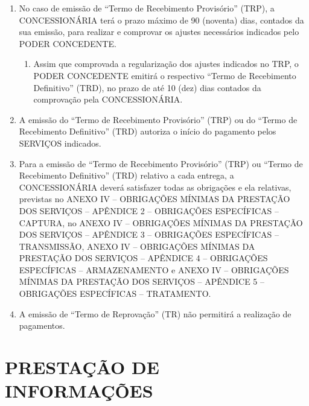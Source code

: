 \documentclass[a4paper,11pt]{report} %
\begin{document}
\begin{enumerate}
\item \label{itm:E3YR}	No caso de emissão de “Termo de Recebimento Provisório” (TRP), a CONCESSIONÁRIA terá o prazo máximo de 90 (noventa) dias, contados da sua emissão, para realizar e comprovar os ajustes necessários indicados pelo PODER CONCEDENTE.

\begin{enumerate}[label*=\arabic*.]
\item \label{itm:PAUP} Assim que comprovada a regularização dos ajustes indicados no TRP, o PODER CONCEDENTE emitirá o respectivo “Termo de Recebimento Definitivo” (TRD), no prazo de até 10 (dez) dias contados da comprovação pela CONCESSIONÁRIA. 
\end{enumerate}

\item \label{itm:79FQ}	A emissão do “Termo de Recebimento Provisório” (TRP) ou do “Termo de Recebimento Definitivo” (TRD) autoriza o início do pagamento pelos SERVIÇOS indicados. 

\item \label{itm:SYZE}	Para a emissão de “Termo de Recebimento Provisório” (TRP) ou “Termo de Recebimento Definitivo” (TRD) relativo a cada entrega, a CONCESSIONÁRIA deverá satisfazer todas as obrigações e ela relativas, previstas no ANEXO IV – OBRIGAÇÕES MÍNIMAS DA PRESTAÇÃO DOS SERVIÇOS – APÊNDICE 2 – OBRIGAÇÕES ESPECÍFICAS – CAPTURA, no ANEXO IV – OBRIGAÇÕES MÍNIMAS DA PRESTAÇÃO DOS SERVIÇOS – APÊNDICE 3 – OBRIGAÇÕES ESPECÍFICAS – TRANSMISSÃO, ANEXO IV – OBRIGAÇÕES MÍNIMAS DA PRESTAÇÃO DOS SERVIÇOS – APÊNDICE 4 – OBRIGAÇÕES ESPECÍFICAS – ARMAZENAMENTO e ANEXO IV – OBRIGAÇÕES MÍNIMAS DA PRESTAÇÃO DOS SERVIÇOS – APÊNDICE 5 – OBRIGAÇÕES ESPECÍFICAS – TRATAMENTO.  

\item \label{itm:7AA8}	A emissão de “Termo de Reprovação” (TR) não permitirá a realização de pagamentos.
\end{enumerate}

\section{PRESTAÇÃO DE INFORMAÇÕES}
\label{sec:D36G}
\end{document}
